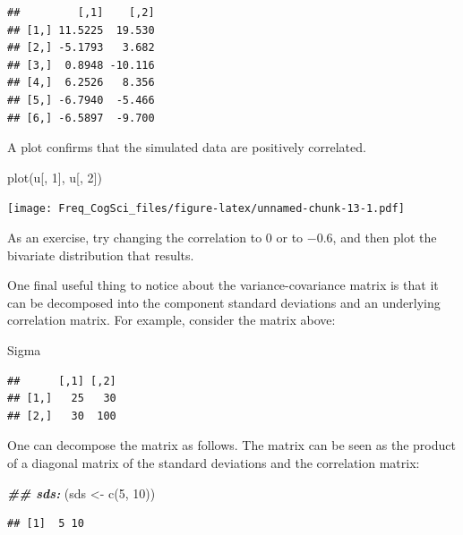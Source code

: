 \documentclass[
  12pt,
]{krantz}
\newenvironment{Shaded}{\begin{snugshade}}{\end{snugshade}}
\newcommand{\DecValTok}[1]{\textcolor[rgb]{0.00,0.00,0.81}{#1}}
\newcommand{\DocumentationTok}[1]{\textcolor[rgb]{0.56,0.35,0.01}{\textbf{\textit{#1}}}}
\newcommand{\FunctionTok}[1]{\textcolor[rgb]{0.00,0.00,0.00}{#1}}
\newcommand{\NormalTok}[1]{#1}
\newcommand{\OtherTok}[1]{\textcolor[rgb]{0.56,0.35,0.01}{#1}}
\theoremstyle{definition}
\theoremstyle{definition}
\theoremstyle{definition}
\theoremstyle{definition}
\theoremstyle{remark}
\begin{document}
\begin{verbatim}
##         [,1]    [,2]
## [1,] 11.5225  19.530
## [2,] -5.1793   3.682
## [3,]  0.8948 -10.116
## [4,]  6.2526   8.356
## [5,] -6.7940  -5.466
## [6,] -6.5897  -9.700
\end{verbatim}

A plot confirms that the simulated data are positively correlated.

\begin{Shaded}
\begin{Highlighting}[]
\FunctionTok{plot}\NormalTok{(u[, }\DecValTok{1}\NormalTok{], u[, }\DecValTok{2}\NormalTok{])}
\end{Highlighting}
\end{Shaded}

\texttt{[image: Freq\_CogSci\_files/figure-latex/unnamed-chunk-13-1.pdf]}

As an exercise, try changing the correlation to \(0\) or to \(-0.6\), and then plot the bivariate distribution that results.

One final useful thing to notice about the variance-covariance matrix is that it can be decomposed into the component standard deviations and an underlying correlation matrix. For example, consider the matrix above:

\begin{Shaded}
\begin{Highlighting}[]
\NormalTok{Sigma}
\end{Highlighting}
\end{Shaded}

\begin{verbatim}
##      [,1] [,2]
## [1,]   25   30
## [2,]   30  100
\end{verbatim}

One can decompose the matrix as follows. The matrix can be seen as the product of a diagonal matrix of the standard deviations and the correlation matrix:

\begin{Shaded}
\begin{Highlighting}[]
\DocumentationTok{\#\# sds:}
\NormalTok{(sds }\OtherTok{\textless{}{-}} \FunctionTok{c}\NormalTok{(}\DecValTok{5}\NormalTok{, }\DecValTok{10}\NormalTok{))}
\end{Highlighting}
\end{Shaded}

\begin{verbatim}
## [1]  5 10
\end{verbatim}
\end{document}
